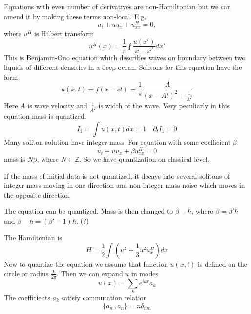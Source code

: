 \documentclass[12pt]{article}
\begin{document}
Equations with even number of derivatives are non-Hamiltonian but we can amend it by making these
terms non-local. E.g.
\begin{equation}
  \label{eq:14}
  u_{t}+u u_{x}+u^{H}_{xx}=0,
\end{equation}
where $u^{H}$ is Hilbert transform
\begin{equation}
  \label{eq:15}
  u^{H}(x)=\frac{1}{\pi} \fint \frac{u(x')}{x-x'}dx' 
\end{equation}
This is Benjamin-Ono equation which describes waves on boundary between two liquids of different
densities in a deep ocean. Solitons for this equation have the form
\begin{equation}
  \label{eq:16}
  u(x,t)=f(x-ct)=\frac{1}{\pi} \frac{A}{(x-A t)^{2}+\frac{1}{A^{2}}}
\end{equation}
Here $A$ is wave velocity and $\frac{1}{A^{2}}$ is width of the wave. Very peculiarly in this
equation mass is quantized.
\begin{equation}
  \label{eq:17}
  I_{1}=\int u(x,t) dx =1\quad \partial_{t} I_{1}=0
\end{equation}
Many-soliton solution have integer mass. For equation with some coefficient $\beta$
\begin{equation}
  \label{eq:18}
   u_{t}+u u_{x}+\beta u^{H}_{xx}=0
\end{equation}
mass is $N\beta$, where $N\in \mathbb{Z}$. So we have quantization on classical level. 

If the mass of initial data is not quantized, it decays into several solitons of integer mass moving
in one direction and non-integer mass noise which moves in the opposite direction. 


The equation can be quantized. Mass is then changed to $\beta-\hbar$, where $\beta=\beta' \hbar$ and
$\beta-\hbar=(\beta'-1)\hbar$. (?)

The Hamiltonian is
\begin{equation}
  \label{eq:19}
  H=\frac{1}{2}\int \left(u^{2}+\frac{1}{3} u^{2} u^{H}_{x}\right) dx
\end{equation}
Now to quantize the equation we assume that function $u(x,t)$ is defined on the circle or radius
$\frac{L}{2\pi}$. Then we can expand $u$ in modes
\begin{equation}
  \label{eq:20}
  u(x)=\sum_{k} e^{i k x}a_{k}
\end{equation}
The coefficients $a_{k}$ satisfy commutation relation
\begin{equation}
  \label{eq:21}
  \{a_{m},a_{n}\}=n\delta_{nm}
\end{equation}
\end{document}
